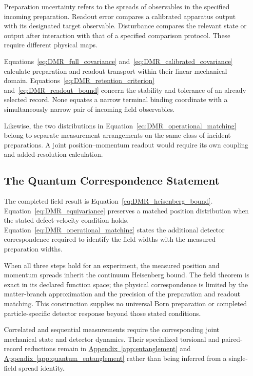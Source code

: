 Preparation uncertainty refers to the spreads of observables in the specified incoming preparation. Readout error compares a calibrated apparatus output with its designated target observable. Disturbance compares the relevant state or output after interaction with that of a specified comparison protocol. These require different physical maps.

Equations~\eqref{eq:DMR_full_covariance} and~\eqref{eq:DMR_calibrated_covariance} calculate preparation and readout transport within their linear mechanical domain. Equations~\eqref{eq:DMR_retention_criterion} and~\eqref{eq:DMR_readout_bound} concern the stability and tolerance of an already selected record. None equates a narrow terminal binding coordinate with a simultaneously narrow pair of incoming field observables.

Likewise, the two distributions in Equation~\eqref{eq:DMR_operational_matching} belong to separate measurement arrangements on the same class of incident preparations. A joint position--momentum readout would require its own coupling and added-resolution calculation.

\subsection{The Quantum Correspondence Statement}

The completed field result is Equation~\eqref{eq:DMR_heisenberg_bound}. Equation~\eqref{eq:DMR_equivariance} preserves a matched position distribution when the stated defect-velocity condition holds. Equation~\eqref{eq:DMR_operational_matching} states the additional detector correspondence required to identify the field widths with the measured preparation widths.

When all three steps hold for an experiment, the measured position and momentum spreads inherit the continuum Heisenberg bound. The field theorem is exact in its declared function space; the physical correspondence is limited by the matter-branch approximation and the precision of the preparation and readout matching. This construction supplies no universal Born preparation or completed particle-specific detector response beyond those stated conditions.

Correlated and sequential measurements require the corresponding joint mechanical state and detector dynamics. Their specialized torsional and paired-record reductions remain in \hyperref[app:entanglement]{Appendix~\ref*{app:entanglement}} and \hyperref[app:quantum_entanglement]{Appendix~\ref*{app:quantum_entanglement}} rather than being inferred from a single-field spread identity.

